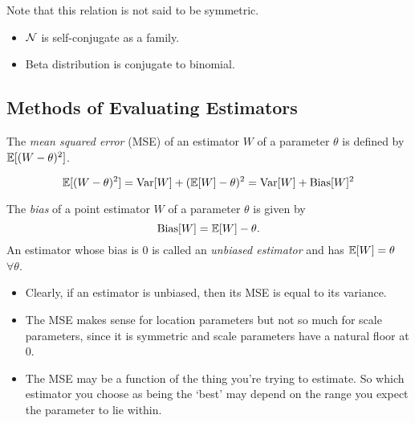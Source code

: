 Note that this relation is not said to be symmetric.

\begin{remark}
    \mbox{}
    \begin{itemize}
        \item $\mathcal{N}{}$ is self-conjugate as a family.
        \item Beta distribution is conjugate to binomial.
    \end{itemize}
\end{remark}


\subsection{Methods of Evaluating Estimators}

\begin{definition}
    The \emph{mean squared error} (MSE) of an estimator $W$ of a parameter $\theta$ is defined by $\mathbb{E}{}[(W - \theta)^2]$.
\end{definition}

\begin{lemma}
    \[
        \mathbb{E}{}[(W - \theta)^2] = \text{Var}{}[W] + (\mathbb{E}{}[W] - \theta)^2 = \text{Var}{}[W] + \text{Bias}[W]^2
    \]
\end{lemma}

\begin{definition}[Bias]
    The \emph{bias} of a point estimator $W$ of a parameter $\theta$ is given by
    \[
        \text{Bias}[W] = \mathbb{E}{}[W] - \theta.
    \]
    An estimator whose bias is 0 is called an \emph{unbiased estimator} and has $\mathbb{E}{}[W] = \theta$ $\forall \theta$.
\end{definition}

\begin{remark}
    \mbox{}
    \begin{itemize}
        \item Clearly, if an estimator is unbiased, then its MSE is equal to its variance.
        \item The MSE makes sense for location parameters but not so much for scale parameters, since it is symmetric and scale parameters have a natural floor at 0.
        \item The MSE may be a function of the thing you're trying to estimate. So which estimator you choose as being the `best' may depend on the range you expect the parameter to lie within.
    \end{itemize}
\end{remark}

